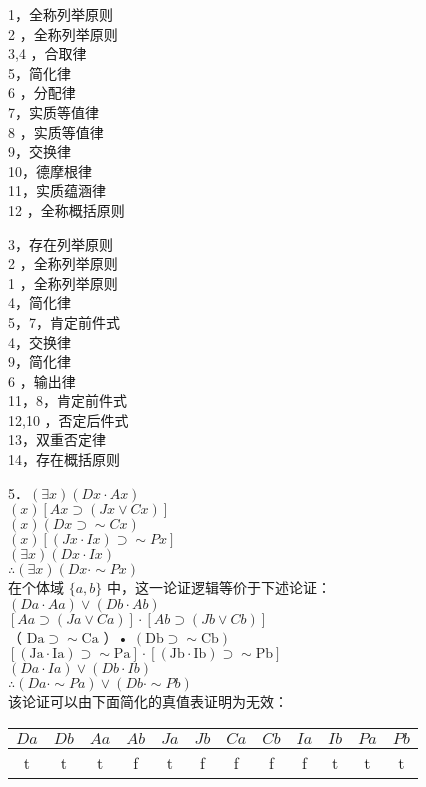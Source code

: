 1，全称列举原则\\
2 ，全称列举原则\\
3,4 ，合取律\\
5，简化律\\
6 ，分配律\\
7，实质等值律\\
8 ，实质等值律\\
9，交换律\\
10，德摩根律\\
11，实质蕴涵律\\
12 ，全称概括原则

3，存在列举原则\\
2 ，全称列举原则\\
1 ，全称列举原则\\
4，简化律\\
5，7，肯定前件式\\
4，交换律\\
9，简化律\\
6 ，输出律\\
11，8，肯定前件式\\
12,10 ，否定后件式\\
13，双重否定律\\
14，存在概括原则

5．$(\exists x)(D x \cdot A x)$\\
$(x)[A x \supset(J x \vee C x)]$\\
$(x)(D x \supset \sim C x)$\\
$(x)[(J x \cdot I x) \supset \sim P x]$\\
$(\exists x)(D x \cdot I x)$\\
$\therefore(\exists x)(D x \cdot \sim P x)$\\
在个体域 $\{a, b\}$ 中，这一论证逻辑等价于下述论证：\\
$(D a \cdot A a) \vee(D b \cdot A b)$\\
$[A a \supset(J a \vee C a)] \cdot[A b \supset(J b \vee C b)]$\\
（ $\mathrm{Da} \supset \sim \mathrm{Ca}$ ）• $(\mathrm{Db} \supset \sim \mathrm{Cb})$\\
$[(\mathrm{Ja} \cdot \mathrm{Ia}) \supset \sim \mathrm{Pa}] \cdot[(\mathrm{Jb} \cdot \mathrm{Ib}) \supset \sim \mathrm{Pb}]$\\
$(D a \cdot I a) \vee(D b \cdot I b)$\\
$\therefore(D a \cdot \sim P a) \vee(D b \cdot \sim P b)$\\
该论证可以由下面简化的真值表证明为无效：

\begin{center}
\begin{tabular}{cccccccccccc}
$D a$ & $D b$ & $A a$ & $A b$ & $J a$ & $J b$ & $C a$ & $C b$ & $I a$ & $I b$ & $P a$ & $P b$ \\
\hline
t & t & t & f & t & f & f & f & f & t & t & t \\
\hline
\end{tabular}
\end{center}

